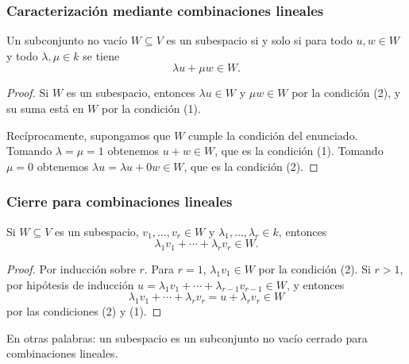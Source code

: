 \begin{frame}
    \frametitle{Caracterización mediante combinaciones lineales}

    \begin{proposition}
        Un subconjunto no vacío $W\subseteq V$ es un subespacio si y solo si
        para todo $u,w\in W$ y todo $\lambda,\mu\in k$ se tiene
        \[
            \lambda u+\mu w\in W.
        \]
    \end{proposition}

    \begin{proof}
        Si $W$ es un subespacio, entonces $\lambda u\in W$ y $\mu w\in W$
        por la condición (2), y su suma está en $W$ por la condición (1).

        \medskip

        Recíprocamente, supongamos que $W$ cumple la condición del enunciado.
        Tomando $\lambda=\mu=1$ obtenemos $u+w\in W$, que es la condición (1).
        Tomando $\mu=0$ obtenemos $\lambda u=\lambda u+0w\in W$, que es la
        condición (2).
    \end{proof}
\end{frame}

\begin{frame}
    \frametitle{Cierre para combinaciones lineales}

    \begin{proposition}
        Si $W\subseteq V$ es un subespacio, $v_1,\ldots,v_r\in W$ y
        $\lambda_1,\ldots,\lambda_r\in k$, entonces
        \[
            \lambda_1v_1+\cdots+\lambda_rv_r\in W.
        \]
    \end{proposition}

    \vspace{-10pt}

    \begin{proof}
        Por inducción sobre $r$. Para $r=1$, $\lambda_1v_1\in W$ por la
        condición (2). Si $r>1$, por hipótesis de inducción
        $u=\lambda_1v_1+\cdots+\lambda_{r-1}v_{r-1}\in W$, y entonces
        \[
            \lambda_1v_1+\cdots+\lambda_rv_r=u+\lambda_rv_r\in W
        \]
        por las condiciones (2) y (1).
    \end{proof}

    \medskip

    En otras palabras: un subespacio es un subconjunto no vacío
    \alert{cerrado para combinaciones lineales}.
\end{frame}

